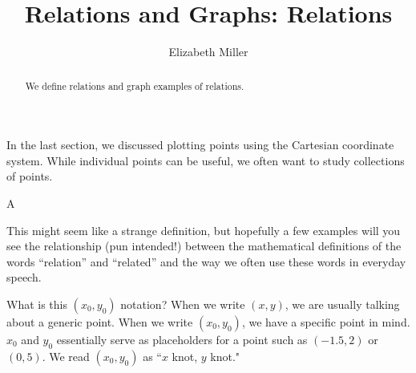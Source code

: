 \documentclass[nooutcomes]{ximera}
\author{Elizabeth Miller}
\title{Relations and Graphs: Relations}
\begin{document}
\begin{abstract}
We define relations and graph examples of relations. 
\end{abstract}
\maketitle


In the last section, we discussed plotting points using the Cartesian coordinate system. While individual points can be useful, we often want to study collections of points.

\begin{definition}
A %
\end{definition}

This might seem like a strange definition, but hopefully a few
examples will you see the relationship (pun intended!) between the
mathematical definitions of the words ``relation'' and ``related'' and the
way we often use these words in everyday speech.

\begin{MM}
What is this $(x_0,y_0)$ notation?  When we write $(x,y)$, we are usually talking about a generic point.  When we write $(x_0,y_0)$, we have a specific point in mind.  $x_0$ and $y_0$ essentially serve as placeholders for a point such as $(-1.5, 2)$ or $(0,5)$. We read $(x_0,y_0)$ as ``$x$ knot, $y$ knot."
\end{MM}


\end{document}
